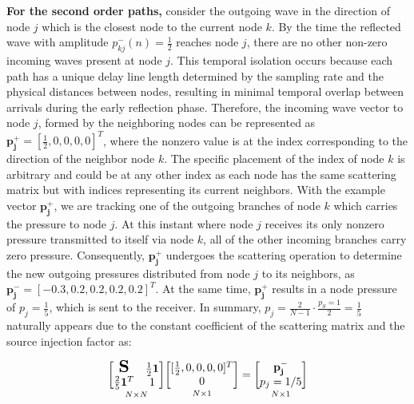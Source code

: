 \documentclass[journal]{IEEEtran}
\begin{document}
\textbf{For the second order paths,} consider the outgoing wave in the direction of node \(j\) which is the closest node to the current node \(k\). 
By the time the reflected wave with amplitude \(p_{kj}^-(n)= \frac{1}{2}\) reaches node \(j\), there are no other non-zero incoming waves present at node \(j\). 
This temporal isolation occurs because each path has a unique delay line length determined by the sampling rate and the physical distances between nodes, resulting in minimal temporal overlap between arrivals during the early reflection phase. 
Therefore, the incoming wave vector to node \(j\), formed by the neighboring nodes can be represented as $\mathbf{p_j^+} = [\frac{1}{2}, 0, 0, 0, 0]^T$, 
where the nonzero value is at the index corresponding to the direction of the neighbor node \(k\). The specific placement of the index of node \(k\) is arbitrary and could be at any other index as each node has the same scattering matrix but with indices representing its current neighbors.
With the example vector $\mathbf{p_j^+}$, we are tracking one of the outgoing branches of node \(k\) which carries the pressure to node \(j\). At this instant where node \(j\) receives its only nonzero pressure transmitted to itself via node \(k\), all of the other incoming branches carry zero pressure. Consequently, $\mathbf{p_j^+}$ undergoes the scattering operation to determine the new outgoing pressures distributed from node \(j\) to its neighbors, as $\mathbf{p_j^-}=[-0.3, 0.2, 0.2, 0.2, 0.2]^T $. At the same time, $\mathbf{p_j^+}$ results in a node pressure of ${p_j}= \frac{1}{5}$, which is sent to the receiver. In summary, \(p_j= \frac{2}{N-1} \cdot \frac{p_{S}=1}{2} = \frac{1}{5}\) naturally appears due to the constant coefficient of the scattering matrix and the source injection factor as: 

\begin{equation}
\label{eq:second_order_pressure}
\underset{N \times N}{\begin{bmatrix}
    \scalebox{1.5}{$\mathbf{S}$} & \frac{1}{2}\mathbf{1} \\
    \frac{2}{5}\mathbf{1}^T & 1
\end{bmatrix}}
\underset{N \times 1}{\begin{bmatrix}
[\frac{1}{2}, 0, 0, 0, 0]^T \\
0
\end{bmatrix}}
=
\underset{N \times 1}{\begin{bmatrix}
\mathbf{p_j^-}
\\
p_j=1/5
\end{bmatrix}}
\end{equation}
\end{document}

